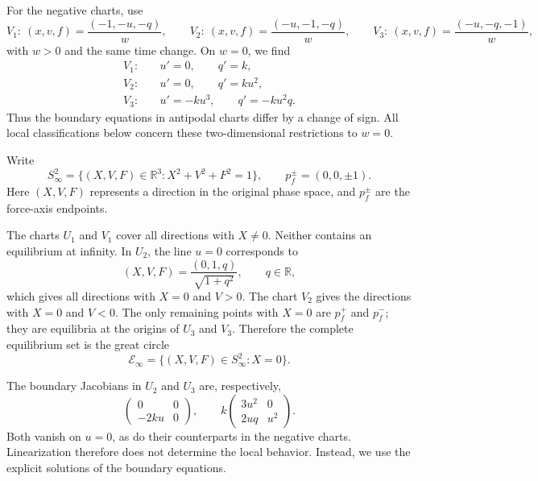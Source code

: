 \documentclass[11pt,reqno]{amsart}
\theoremstyle{plain}
\theoremstyle{definition}
\theoremstyle{remark}
\begin{document}
For the negative charts, use
\[
V_1:\ (x,v,f)=\frac{(-1,-u,-q)}w,\qquad
V_2:\ (x,v,f)=\frac{(-u,-1,-q)}w,\qquad
V_3:\ (x,v,f)=\frac{(-u,-q,-1)}w,
\]
with $w>0$ and the same time change. On $w=0$, we find
\[
\begin{aligned}
V_1:&\quad u'=0,\qquad q'=k,\\
V_2:&\quad u'=0,\qquad q'=ku^2,\\
V_3:&\quad u'=-ku^3,\qquad q'=-ku^2q.
\end{aligned}
\]
Thus the boundary equations in antipodal charts differ by a
change of sign. All local classifications below concern these
two-dimensional restrictions to $w=0$.


Write
\[
S_\infty^2=\{(X,V,F)\in\mathbb R^3:X^2+V^2+F^2=1\},
\qquad p_f^\pm=(0,0,\pm1).
\]
Here $(X,V,F)$ represents a direction in the original phase
space, and $p_f^\pm$ are the force-axis endpoints.

The charts $U_1$ and $V_1$ cover all directions with $X\neq0$.
Neither contains an equilibrium at infinity. In $U_2$, the
line $u=0$ corresponds to
\[
(X,V,F)=\frac{(0,1,q)}{\sqrt{1+q^2}},\qquad q\in\mathbb R,
\]
which gives all directions with $X=0$ and $V>0$.
The chart $V_2$ gives the directions with $X=0$ and $V<0$.
The only remaining points with $X=0$ are $p_f^+$ and $p_f^-$;
they are equilibria at the origins of $U_3$ and $V_3$.
Therefore the complete equilibrium set is the great circle
\begin{equation}
\label{eq:equilibrium-circle}
\mathcal E_\infty=\{(X,V,F)\in S_\infty^2:X=0\}.
\end{equation}

The boundary Jacobians in $U_2$ and $U_3$ are, respectively,
\[
\begin{pmatrix}0&0\\-2ku&0\end{pmatrix},
\qquad
k\begin{pmatrix}3u^2&0\\2uq&u^2\end{pmatrix}.
\]
Both vanish on $u=0$, as do their counterparts in the negative
charts. Linearization therefore does not determine the local
behavior. Instead, we use the explicit solutions of the
boundary equations.
\end{document}
